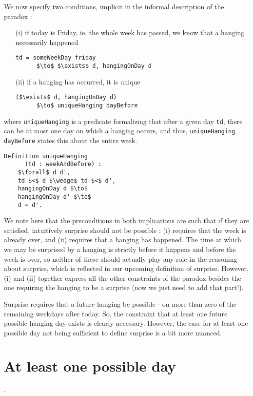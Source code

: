 \documentclass[journal]{journal}
\begin{document}
We now specify two conditions, implicit in the informal
description of the paradox :

\begin{itemize}
  \item[(i)] if today is Friday, ie. the whole
  week has passed, we know that a hanging necessarily happened
  \begin{lstlisting}[mathescape=true]
    td = someWeekDay friday
      $\to$ $\exists$ d, hangingOnDay d
  \end{lstlisting}
  \item[(ii)] if a hanging has occurred, it is unique
  \begin{lstlisting}[mathescape=true]
    ($\exists$ d, hangingOnDay d)
      $\to$ uniqueHanging dayBefore
  \end{lstlisting}
\end{itemize}

where {\tt uniqueHanging} is a predicate formalizing that after a given day {\tt td},
there can be at most one day on which a hanging occurs, and thus,
{\tt uniqueHanging dayBefore} states this about the entire week.

\begin{lstlisting}[mathescape=true]
  Definition uniqueHanging
      (td : weekAndBefore) :
    $\forall$ d d',
    td $<$ d $\wedge$ td $<$ d',
    hangingOnDay d $\to$
    hangingOnDay d' $\to$
    d = d'.
\end{lstlisting}

We note here that the preconditions in both implications are such that if
they are satisfied, intuitively surprise should not be possible : (i)
requires that the week is already over, and (ii) requires that a hanging
has happened. The time at which we may be surprised by a hanging is strictly
before it happens and before the week is over, so neither of these should
actually play any role in the reasoning about surprise, which is reflected
in our upcoming definition of surprise. However, (i) and (ii) together express all the
other constraints of the paradox besides the one requiring the hanging to
be a surprise (now we just need to add that part!).

Surprise requires that a future hanging be possible - on more than zero
of the remaining weekdays after today.
So, the constraint that at least one future possible hanging day exists is
clearly necessary. However, the case for at least one possible day not
being sufficient to define surprise is a bit more nuanced.

\section{At least one possible day}.
\label{sec:one}
\end{document}
